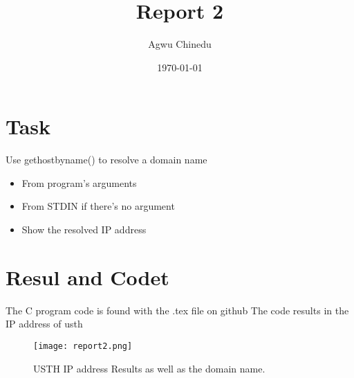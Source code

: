 \documentclass[letterpaper,12pt]{article}
\begin{document}
\title{Report 2}
\author{Agwu Chinedu}
\date{\today}
\maketitle


\section{Task}
Use gethostbyname() to resolve a domain name

\begin{itemize}
\item From program’s arguments
\item From STDIN if there’s no argument
\item Show the resolved IP address
\end{itemize}


\section{Resul and Codet}
The C program code is found with the .tex file on github
The code results in the IP address of usth
\begin{figure}
        \centering \texttt{[image: report2.png]}

        \caption{  \label{fig:samplesetup}
                USTH IP address Results as well as the domain name. }
\end{figure}
\end{document}
